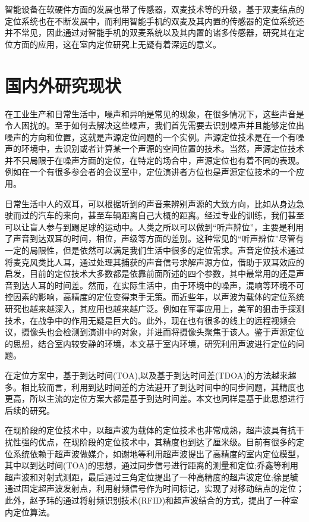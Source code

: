 \documentclass[winfonts,oneside]{njuthesis}
\begin{document}
		智能设备在软硬件方面的发展也带了传感器，双麦技术等的升级，基于双麦结点的定位系统也在不断发展中，而利用智能手机的双麦及其内置的传感器的定位系统还并不常见，因此通过对智能手机的双麦系统以及其内置的诸多传感器，研究其在定位方面的应用，这在室内定位研究上无疑有着深远的意义。
				
	\section{国内外研究现状}
	
		在工业生产和日常生活中，噪声和异响是常见的现象，在很多情况下，这些声音是令人困扰的。至于如何去解决这些噪声，我们首先需要去识别噪声并且能够定位出噪声的方向和位置，这就是声源定位问题的一个实例。声源定位技术\cite{kekun}是在一个有噪声的环境中，去识别或者计算某一个声源的空间位置的技术。当然，声源定位技术并不只局限于在噪声方面的定位，在特定的场合中，声源定位也有着不同的表现。例如在一个有很多参会者的会议室中，定位演讲者方位也是声源定位技术的一个应用。
		
		日常生活中人的双耳，可以根据听到的声音来辨别声源的大致方向，比如从身边急驶而过的汽车的来向，甚至车辆距离自己大概的距离。经过专业的训练，我们甚至可以让盲人参与到踢足球的运动中。人类之所以可以做到“听声辨位”，主要是利用了声音到达双耳的时间，相位，声级等方面的差别。这种常见的“听声辨位”尽管有一定的局限性，但是依然可以满足我们生活中很多的定位需求。声音定位技术通过将麦克风类比人耳，通过处理其捕获的声音信号求解声源方位，借助于双耳效应的启发，目前的定位技术大多数都是依靠前面所述的四个参数，其中最常用的还是声音到达人耳的时间差。然而，在实际生活中，由于环境中的噪声，混响等环境不可控因素的影响，高精度的定位变得束手无策。而近些年，以声波为载体的定位系统研究也越来越深入，其应用也越来越广泛。例如在军事应用上，美军的狙击手探测技术\cite{Sniper}，在战争中的作用无疑是巨大的。此外，现在也有很多的线上的远程视频会议，摄像头也会检测到演讲中的对象，并进而将摄像头聚焦于该人。鉴于声源定位的思想，结合室内较安静的环境，本文基于室内环境，研究利用声波进行定位的问题。
		
		在定位方案中，基于到达时间(TOA),以及基于到达时间差(TDOA)的方法越来越多。相比较而言，利用到达时间差的方法避开了到达时间中的同步问题，其精度也更高，所以主流的定位方案大都是基于到达时间差。本文也同样是基于此思想进行后续的研究。
		
		在现阶段的定位技术中，以超声波为载体的定位技术\cite{wangfudong}也非常成熟，超声波具有抗干扰性强的优点，在现阶段的定位技术中，其精度也到达了厘米级。目前有很多的定位系统依赖于超声波做媒介，如谢地等利用超声波提出了高精度的室内定位模型，其中以到达时间(TOA)的思想，通过同步信号进行距离的测量和定位\cite{xiedi};乔鑫等利用超声波和对射式测距，最后通过三角定位提出了一种高精度的超声波定位\cite{qiaoxin};徐昆毓通过固定超声波发射点，利用射频信号作为时间标记，实现了对移动结点的定位\cite{xukunyu}；此外，赵予玮的通过将射频识别技术(RFID)和超声波结合的方式，提出了一种室内定位算法\cite{zhaoyuwei}。
		
\end{document}

